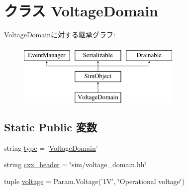 \hypertarget{classVoltageDomain_1_1VoltageDomain}{
\section{クラス VoltageDomain}
\label{classVoltageDomain_1_1VoltageDomain}
}
VoltageDomainに対する継承グラフ:\begin{figure}[H]
\begin{center}
\leavevmode
\includegraphics[height=3cm]{classVoltageDomain_1_1VoltageDomain}
\end{center}
\end{figure}
\subsection*{Static Public 変数}
\begin{DoxyCompactItemize}
\item 
string \hyperlink{classVoltageDomain_1_1VoltageDomain_acce15679d830831b0bbe8ebc2a60b2ca}{type} = '\hyperlink{classVoltageDomain_1_1VoltageDomain}{VoltageDomain}'
\item 
string \hyperlink{classVoltageDomain_1_1VoltageDomain_a17da7064bc5c518791f0c891eff05fda}{cxx\_\-header} = \char`\"{}sim/voltage\_\-domain.hh\char`\"{}
\item 
tuple \hyperlink{classVoltageDomain_1_1VoltageDomain_a129c12be8ba4068175594eb00cc0114e}{voltage} = Param.Voltage('1V', \char`\"{}Operational voltage\char`\"{})
\end{DoxyCompactItemize}


